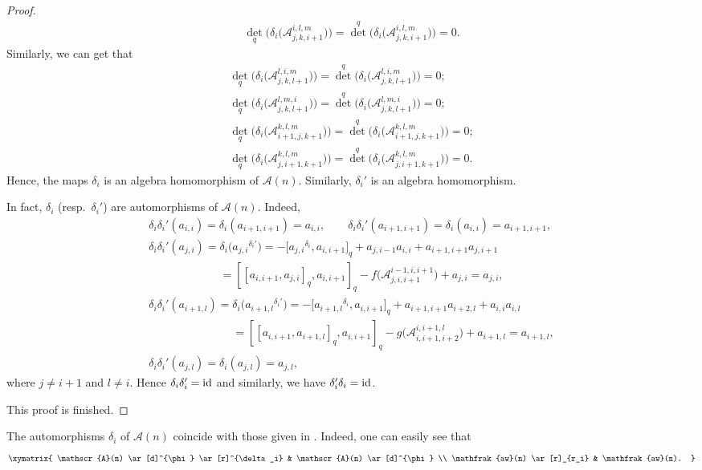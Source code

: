 \documentclass[pdftex]{sigma}
\numberwithin{equation}{section}
\def\id{{\rm id}}
\def\lr#1{\left[#1\right]}
\def\lrb#1{\left(#1\right)}
\def\d{\delta}
\def\A{\mathscr{A}}
\def\aw{\mathfrak{aw}}
\begin{document}
\begin{proof}
\begin{gather*}
{\det}_q \bigl(\d_i \bigl(\A_{j,k,i+1}^{i,l,m} \bigr) \bigr) ={\det}^q \bigl(\d_i \bigl(\A_{j,k,i+1}^{i,l,m} \bigr) \bigr)=0.
\end{gather*}
Similarly, we can get that
\begin{gather*}
{\det}_q \bigl(\d_i \bigl(\A_{j,k,l+1}^{l,i,m} \bigr) \bigr) ={\det}^q \bigl(\d_i \bigl(\A_{j,k,l+1}^{l,i,m} \bigr) \bigr)=0;\\
{\det}_q \bigl(\d_i \bigl(\A_{j,k,l+1}^{l, m, i} \bigr) \bigr) ={\det}^q \bigl(\d_i \bigl(\A_{j,k,l+1}^{l, m, i} \bigr) \bigr)=0;\\
{\det}_q \bigl(\d_i \bigl(\A_{i+1,j,k+1}^{k,l,m} \bigr) \bigr) ={\det}^q \bigl(\d_i \bigl(\A_{i+1,j,k+1}^{k,l,m} \bigr) \bigr)=0;\\
{\det}_q \bigl(\d_i \bigl(\A_{j,i+1,k+1}^{k,l,m} \bigr) \bigr) ={\det}^q \bigl(\d_i \bigl(\A_{j,i+1,k+1}^{k,l,m} \bigr) \bigr)=0.
\end{gather*}
Hence, the maps $\d_i$ is an algebra homomorphism of $\A(n)$.
Similarly, $\d_i'$ is an algebra homomorphism.

In fact, $\d_i$ (resp.\ $\d_i'$) are automorphisms of $\A(n)$.
Indeed,
\begin{gather*}
\d_i\d_i'\lrb{a_{i,i}} = \d_i\lrb{a_{i+1,i+1}}=a_{i,i},\qquad
\d_i\d_i'\lrb{a_{i+1,i+1}} = \d_i\lrb{a_{i,i}}=a_{i+1,i+1},\\
\d_i\d_i'\lrb{a_{j,i}} = \d_i\bigl({a_{j,i}}^{\d_i'}\bigr)
 = -\bigl[{a_{j,i}}^{\d_i}, a_{i,i+1}\bigr]_q+a_{j,i-1}a_{i,i}+a_{i+1,i+1}a_{j,i+1}\\
\phantom{\d_i\d_i'\lrb{a_{j,i}} = }{} = [\lr{a_{i,i+1}, a_{j,i}}_q, a_{i,i+1}]_q-f\bigl(\A_{j,i,i+1}^{i-1,i,i+1}\bigr)+a_{j,i}
 = a_{j,i},\\
\d_i\d_i'\lrb{a_{i+1,l}} = \d_i\bigl({a_{i+1,l}}^{\d_i'}\bigr)
 = -\bigl[{a_{i+1,l}}^{\d_i} , a_{i,i+1}\bigr]_q+a_{i+1,i+1}a_{i+2,l}+a_{i,i}a_{i,l}\\
\phantom{\d_i\d_i'\lrb{a_{i+1,l}} =}{} = [\lr{a_{i,i+1}, a_{i+1,l}}_q, a_{i,i+1}]_q -g\bigl(\A_{i,i+1,i+2}^{i,i+1,l}\bigr)+a_{i+1,l}
 = a_{i+1,l},\\
\d_i\d_i'\lrb{a_{j,l}} = \d_i\lrb{a_{j,l}}=a_{j,l},
\end{gather*}
where $j \neq i+1$ and $l \neq i$.
Hence $\d_i\d_i'=\id$ and similarly, we have $\d_i'\d_i=\id$.

This proof is finished.
\end{proof}

\begin{remark}
The automorphisms $\d_i$ of $\A(n)$ coincide with those given in
{\rm\cite{CFPR(2023)}}. Indeed, one can easily see that
\begin{equation*}
\xymatrix{
 \A(n) \ar[d]^{\phi} \ar[r]^{\d_i}
 & \A(n) \ar[d]^{\phi} \\
 \aw(n) \ar[r]_{r_i}
 & \aw(n).
}
\end{equation*}
\end{remark}
\end{document}
